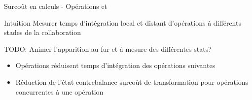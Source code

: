 \begin{frame}{Surcoût en calculs - Opérations \ins et \rmv}
    \begin{block}{Intuition}
        Mesurer temps d'intégration \alert{local} et \alert{distant} d'opérations \ins à différents stades de la collaboration
    \end{block}
    TODO: Animer l'apparition au fur et à mesure des différentes stats?
    \begin{figure}[!ht]
        \centering
    \end{figure}
    \begin{itemize}
        \item Opérations \ren réduisent temps d'intégration des opérations suivantes
        \item Réduction de l'état contrebalance surcoût de transformation pour opérations concurrentes à une opération \ren
    \end{itemize}
\end{frame}

